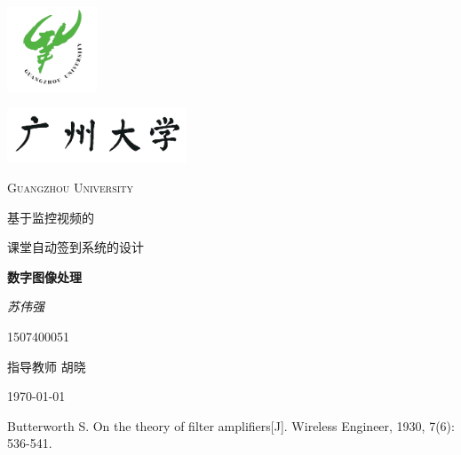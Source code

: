 \documentclass[10pt,a4paper]{article}
\begin{document}
\begin{titlepage}
	\centering
	\includegraphics[width=0.2\textwidth]{sf1.png}\par
	\vspace{0.5cm}
	\includegraphics[width=0.4\textwidth]{sf.png}\par
	\vspace{0.1cm}
	{\scshape\LARGE Guangzhou University \par}
	\vspace{1cm}
	{\kaishu\huge 基于监控视频的\par}
	\vspace{0.5cm}
	{\kaishu\huge 课堂自动签到系统的设计\par}
	\vspace{5cm}
	{\LARGE\bfseries 数字图像处理\par}
	\vspace{1cm}
	{\fangsong\Large\itshape 苏伟强\par}
	\vspace{1cm}
	{1507400051}\par
	\par
	指导教师	\textsc{胡晓}
	\vfill
	{\large \today\par}
\end{titlepage}
\tableofcontents
\newpage


\begin{thebibliography}{4}
	Butterworth S. On the theory of filter amplifiers[J]. Wireless Engineer, 1930, 7(6): 536-541.
\end{thebibliography}
\end{document}
